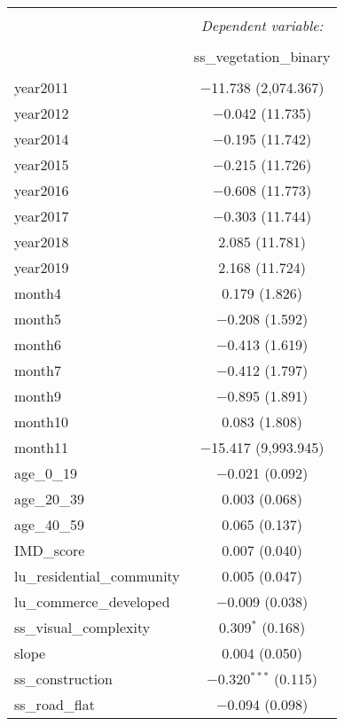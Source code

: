 
\begin{table}[!htbp] \centering 
  \caption{} 
  \label{} 
\small 
\begin{tabular}{@{\extracolsep{1pt}}lc} 
\\[-1.8ex]\hline 
\hline \\[-1.8ex] 
 & \multicolumn{1}{c}{\textit{Dependent variable:}} \\ 
\cline{2-2} 
\\[-1.8ex] & ss\_vegetation\_binary \\ 
\hline \\[-1.8ex] 
 year2011 & $-$11.738 (2,074.367) \\ 
  year2012 & $-$0.042 (11.735) \\ 
  year2014 & $-$0.195 (11.742) \\ 
  year2015 & $-$0.215 (11.726) \\ 
  year2016 & $-$0.608 (11.773) \\ 
  year2017 & $-$0.303 (11.744) \\ 
  year2018 & 2.085 (11.781) \\ 
  year2019 & 2.168 (11.724) \\ 
  month4 & 0.179 (1.826) \\ 
  month5 & $-$0.208 (1.592) \\ 
  month6 & $-$0.413 (1.619) \\ 
  month7 & $-$0.412 (1.797) \\ 
  month9 & $-$0.895 (1.891) \\ 
  month10 & 0.083 (1.808) \\ 
  month11 & $-$15.417 (9,993.945) \\ 
  age\_0\_19 & $-$0.021 (0.092) \\ 
  age\_20\_39 & 0.003 (0.068) \\ 
  age\_40\_59 & 0.065 (0.137) \\ 
  IMD\_score & 0.007 (0.040) \\ 
  lu\_residential\_community & 0.005 (0.047) \\ 
  lu\_commerce\_developed & $-$0.009 (0.038) \\ 
  ss\_visual\_complexity & 0.309$^{*}$ (0.168) \\ 
  slope & 0.004 (0.050) \\ 
  ss\_construction & $-$0.320$^{***}$ (0.115) \\ 
  ss\_road\_flat & $-$0.094 (0.098) \\ 

\end{tabular}
\end{table}
